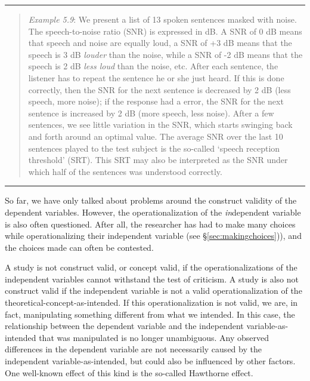 \documentclass[
]{book}
\begin{document}
\begin{center}\rule{0.5\linewidth}{0.5pt}\end{center}

\begin{quote}
\emph{Example 5.9}: We present a list of 13 spoken sentences masked with noise. The speech-to-noise ratio (SNR) is expressed in dB. A SNR of 0 dB means that speech and noise are equally loud, a SNR of +3 dB means that the speech is 3 dB \emph{louder} than the noise, while a SNR of -2 dB means that the speech is 2 dB \emph{less loud} than the noise, etc. After each sentence, the listener has to repeat the sentence he or she just heard. If this is done correctly, then the SNR for the next sentence is decreased by 2 dB (less speech, more noise); if the response had a error, the SNR for the next sentence is increased by 2 dB (more speech, less noise). After a few sentences, we see little variation in the SNR, which starts swinging back and forth around an optimal value. The average SNR over the last 10 sentences played to the test subject is the so-called `speech reception threshold' (SRT). This SRT may also be interpreted as the SNR under which half of the sentences was understood correctly.
\end{quote}

\begin{center}\rule{0.5\linewidth}{0.5pt}\end{center}

So far, we have only talked about problems around the construct validity of the dependent variables. However, the operationalization of the \emph{in}dependent variable is also often questioned. After all, the researcher has had to make many choices while operationalizing their independent variable (see §\ref{sec:makingchoices})), and the choices made can often be contested.

A study is not construct valid, or concept valid, if the operationalizations of the independent variables cannot withstand the test of criticism. A study is also not construct valid if the independent variable is not a valid operationalization of the theoretical-concept-as-intended. If this operationalization is not valid, we are, in fact, manipulating something different from what we intended. In this case, the relationship between the dependent variable and the independent variable-as-intended that was manipulated is no longer unambiguous. Any observed differences in the dependent variable are not necessarily caused by the independent variable-as-intended, but could also be influenced by other factors. One well-known effect of this kind is the so-called Hawthorne effect.
\end{document}
